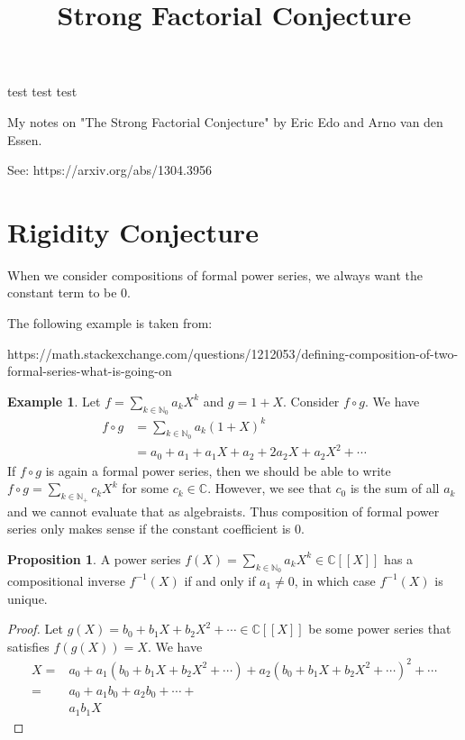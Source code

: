 \documentclass[a4paper]{article}
\title{Strong Factorial Conjecture}
\theoremstyle{definition}
\newtheorem{example}{Example}[definition]
\newtheorem{proposition}[definition]{Proposition}
\begin{document}

test test test

My notes on "The Strong Factorial Conjecture" by Eric Edo and Arno van den Essen.

See: https://arxiv.org/abs/1304.3956

\section{Rigidity Conjecture}

When we consider compositions of formal power series, we always want the constant term to be \(0\).

The following example is taken from:

https://math.stackexchange.com/questions/1212053/defining-composition-of-two-formal-series-what-is-going-on

\begin{example}
    Let \(f = \sum_{k \in \mathbb{N}_0} a_k X^k\) and \(g = 1 + X\). Consider \(f \circ g\). We have
    \begin{align*}
        f \circ g &= \sum_{k \in \mathbb{N}_0} a_k (1 + X)^k \\
        &= a_0 + a_1 + a_1 X + a_2 + 2 a_2 X + a_2 X^2 + \cdots
    \end{align*}
    If \(f \circ g\) is again a formal power series, then we should be able to write \(f \circ g = \sum_{k \in \mathbb{N}_+} c_k X^k\) for some \(c_k \in \mathbb{C}\). However, we see that \(c_0\) is the sum of all \(a_k\) and we cannot evaluate that as algebraists. Thus composition of formal power series only makes sense if the constant coefficient is \(0\).
\end{example}

\begin{proposition}
    A power series \(f(X) = \sum_{k \in \mathbb{N}_0} a_k X^k \in \mathbb{C}[[X]]\) has a compositional inverse \(f^{-1}(X)\) if and only if \(a_1 \neq 0\), in which case \(f^{-1}(X)\) is unique.
\end{proposition}

\begin{proof}
    Let \(g(X) = b_0 + b_1 X + b_2 X^2 + \cdots \in \mathbb{C}[[X]]\) be some power series that satisfies \(f(g(X)) = X\). We have
    \begin{align}
        X =& a_0 + a_1(b_0 + b_1 X + b_2 X^2 + \cdots) + a_2 (b_0 + b_1 X + b_2 X^2 + \cdots)^2 + \cdots \\
        =& a_0 + a_1 b_0 + a_2 b_0 + \cdots + \\
        &a_1 b_1 X
    \end{align}
\end{proof}
\end{document}
